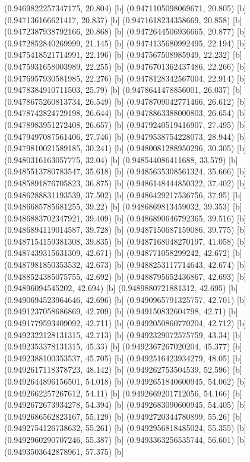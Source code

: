 {{{(0.9469822257347175, 20.804) [b] 
(0.9471105098069671, 20.805) [b] 
(0.947136166621417, 20.837) [b] 
(0.9471618234358669, 20.858) [b] 
(0.9472387938792166, 20.868) [b] 
(0.9472644506936665, 20.877) [b] 
(0.9472852840269999, 21.145) [b] 
(0.9474135680992495, 22.194) [b] 
(0.9475418521714991, 22.196) [b] 
(0.947567508985949, 22.232) [b] 
(0.9475931658003989, 22.255) [b] 
(0.9476701362437486, 22.266) [b] 
(0.9476957930581985, 22.276) [b] 
(0.9478128342567004, 22.914) [b] 
(0.9478384910711503, 25.79) [b] 
(0.9478641478856001, 26.037) [b] 
(0.9478675260813734, 26.549) [b] 
(0.9478709042771466, 26.612) [b] 
(0.9478742824729198, 26.644) [b] 
(0.9478863388000803, 26.654) [b] 
(0.9478983951272408, 26.657) [b] 
(0.9479240519416907, 27.495) [b] 
(0.9479497087561406, 27.746) [b] 
(0.9479538754228073, 28.944) [b] 
(0.9479810021589185, 30.241) [b] 
(0.9480081288950296, 30.305) [b] 
(0.9480316163057775, 32.04) [b] 
(0.948544086411688, 33.579) [b] 
(0.9485513780783547, 35.618) [b] 
(0.9485635308561324, 35.666) [b] 
(0.9485891876705823, 36.875) [b] 
(0.9486148444850322, 37.402) [b] 
(0.9486288831193539, 37.502) [b] 
(0.9486429217536756, 37.95) [b] 
(0.9486685785681255, 39.22) [b] 
(0.9486869813459032, 39.353) [b] 
(0.9486883702347921, 39.409) [b] 
(0.9486890646792365, 39.516) [b] 
(0.9486894119014587, 39.728) [b] 
(0.9487150687159086, 39.775) [b] 
(0.9487154159381308, 39.835) [b] 
(0.9487168048270197, 41.058) [b] 
(0.9487439315631309, 42.671) [b] 
(0.948771058299242, 42.672) [b] 
(0.9487981850353532, 42.673) [b] 
(0.9488253117714643, 42.674) [b] 
(0.9488524385075755, 42.692) [b] 
(0.9488795652436867, 42.693) [b] 
(0.94896094545202, 42.694) [b] 
(0.9489880721881312, 42.695) [b] 
(0.9490694523964646, 42.696) [b] 
(0.9490965791325757, 42.701) [b] 
(0.9491237058686869, 42.709) [b] 
(0.949150832604798, 42.71) [b] 
(0.9491779593409092, 42.711) [b] 
(0.9492050860770204, 42.712) [b] 
(0.9492322128131315, 42.713) [b] 
(0.9492329072575759, 43.34) [b] 
(0.9492353378131315, 45.33) [b] 
(0.9492367267020204, 45.377) [b] 
(0.9492388100353537, 45.705) [b] 
(0.9492516423934279, 48.05) [b] 
(0.9492617118378723, 48.142) [b] 
(0.949262753504539, 52.596) [b] 
(0.9492644896156501, 54.018) [b] 
(0.9492651840600945, 54.062) [b] 
(0.9492662257267612, 54.11) [b] 
(0.9492669201712056, 54.166) [b] 
(0.9492672673934278, 54.394) [b] 
(0.9492683090600945, 54.405) [b] 
(0.9492686562823167, 55.129) [b] 
(0.9492720344780899, 55.26) [b] 
(0.9492754126738632, 55.261) [b] 
(0.9492956818485024, 55.355) [b] 
(0.9492960290707246, 55.387) [b] 
(0.9493363256535744, 56.601) [b] 
(0.9493503642878961, 57.375) [b] 
}}}
